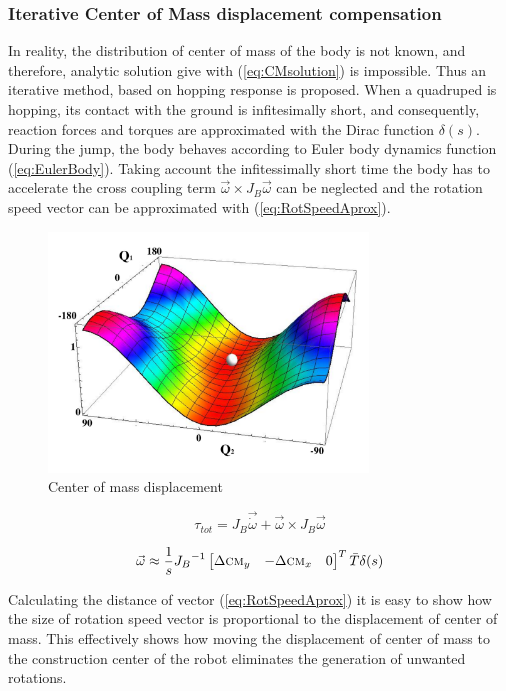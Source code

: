 \subsubsection{Iterative Center of Mass displacement compensation}
In reality, the distribution of center of mass of the body is not known, and therefore, analytic solution give with (\ref{eq:CMsolution}) is impossible. Thus an iterative method, based on hopping response is proposed. When a quadruped is hopping, its contact with the ground is infitesimally short, and consequently, reaction forces and torques are approximated with the Dirac function $\delta (s)$. During the jump, the body behaves according to Euler body dynamics function (\ref{eq:EulerBody}). Taking account the infitessimally short time the body has to accelerate the cross coupling term $\vec{\omega}\times J_B\vec{\omega}$ can be neglected and the rotation speed vector can be approximated with (\ref{eq:RotSpeedAprox}).
\begin{figure}
	\centering
	\includegraphics[width=85mm]{./pictures/RobinRepicCM.pdf}
	\caption{Center of mass displacement}
	\label{fig:rmoment}
\end{figure}

\begin{equation}\label{eq:EulerBody}
\tau_{tot}=J_B\vec{\dot{\omega}}+\vec{\omega}\times J_B\vec{\omega}
\end{equation}

\begin{equation}\label{eq:RotSpeedAprox}
\vec{\omega}\approx \frac{1}{s}{J_B}^{-1}\begin{bmatrix}
\Delta \textsc{cm}_y & -\Delta \textsc{cm}_x & 0
\end{bmatrix}^T\bar{T}\delta(s)
\end{equation}

Calculating the distance of vector (\ref{eq:RotSpeedAprox}) it is easy to show how the size of rotation speed vector is proportional to the displacement of center of mass. This effectively shows how moving the displacement of center of mass to the construction center of the robot eliminates the generation of unwanted rotations. 

